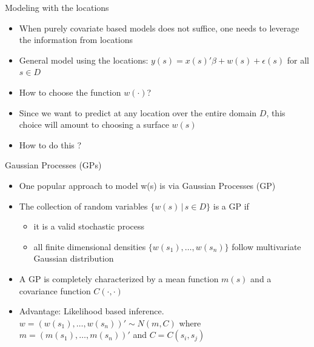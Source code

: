 \documentclass[xcolor=pdftex,dvipsnames,table,numbers,hyperref={pdfpagelabels=false},compress]{beamer}
\newcommand{\myitem}{\vskip3mm \item}
\newcommand{\given}{\,|\,}
\newcommand{\blue}[1]{{\color{RoyalBlue!90} #1}}
\newcommand{\red}[1]{{\color{Red} #1}}
\newcommand{\eps}{\epsilon}
\begin{document}

\begin{frame}{Modeling with the locations}
	\begin{itemize}
		\myitem When purely covariate based models does not suffice, one needs to leverage the information from locations
		\myitem General model using the locations: $y(s)=x(s)'\beta + w(s) + \eps(s)$ for all $s \in D$
		\myitem How to choose the function $w(\cdot)$?
		\myitem Since we want to predict at any location over the entire domain $D$, this choice will amount to choosing a \blue{surface} $w(s)$
		\myitem How to do this ? 
	\end{itemize}
\end{frame}

\begin{frame}{Gaussian Processes (GPs)}
	\begin{itemize}
		\item One popular approach to \blue{model} w(s) is via Gaussian Processes (GP)
		\item The collection of random variables $\{w(s) \given s\in D\}$ is a GP if 
		\begin{itemize}
			\item it is a \red{valid} stochastic process
			\item all finite dimensional densities $\{w(s_1),\ldots,w(s_n)\}$ follow multivariate Gaussian distribution
		\end{itemize}
		\item A GP is completely characterized by a mean function $m(s)$ and a covariance function $C(\cdot,\cdot)$
		\item \red{Advantage:} \blue{Likelihood} based inference. $w=(w(s_1),\ldots,w(s_n))' \sim N(m,C)$ where $m=(m(s_1),\ldots,m(s_n))'$ and $C=C(s_i,s_j)$
	\end{itemize}
\end{frame}
\end{document}
